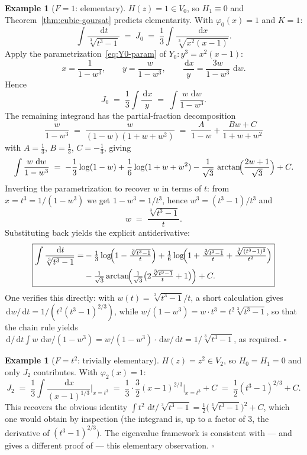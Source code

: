 \documentclass[11pt,a4paper]{article}
\theoremstyle{plain}
\theoremstyle{definition}
\newtheorem{example}[theorem]{Example}
\theoremstyle{remark}
\renewcommand{\d}{\,\mathrm{d}}
\begin{document}
\begin{example}[$F=1$: elementary]\label{ex:F1}
$H(z)=1\in V_0$, so $H_1\equiv 0$ and Theorem~\ref{thm:cubic-goursat} predicts elementarity. With $\varphi_0(x)=1$ and $K=1$:
\[
  \int \frac{\d t}{\sqrt[3]{t^3-1}} \;=\; J_0 \;=\; \frac{1}{3}\int \frac{\d x}{\sqrt[3]{x^2(x-1)}}.
\]
Apply the parametrization~\eqref{eq:Y0-param} of $Y_0\colon y^3=x^2(x-1)$:
\[
  x = \frac{1}{1-w^3},\qquad y = \frac{w}{1-w^3},\qquad \frac{\d x}{y} = \frac{3w}{1-w^3}\,\d w.
\]
Hence
\[
  J_0 \;=\; \frac{1}{3}\int \frac{\d x}{y} \;=\; \int \frac{w\,\d w}{1-w^3}.
\]
The remaining integrand has the partial-fraction decomposition
\[
  \frac{w}{1-w^3} \;=\; \frac{w}{(1-w)(1+w+w^2)} \;=\; \frac{A}{1-w} + \frac{Bw+C}{1+w+w^2}
\]
with $A=\tfrac{1}{3}$, $B=\tfrac{1}{3}$, $C=-\tfrac{1}{3}$, giving
\[
  \int \frac{w\,\d w}{1-w^3} \;=\; -\frac{1}{3}\log(1-w) + \frac{1}{6}\log(1+w+w^2) - \frac{1}{\sqrt{3}}\,\arctan\!\Bigl(\frac{2w+1}{\sqrt{3}}\Bigr) + C.
\]
Inverting the parametrization to recover $w$ in terms of $t$: from $x=t^3=1/(1-w^3)$ we get $1-w^3=1/t^3$, hence $w^3 = (t^3-1)/t^3$ and
\[
  w \;=\; \frac{\sqrt[3]{t^3-1}}{t}.
\]
Substituting back yields the explicit antiderivative:
\[
\boxed{
\begin{aligned}
  \int \frac{\d t}{\sqrt[3]{t^3-1}}
   = &-\tfrac{1}{3}\log\!\Bigl(1-\tfrac{\sqrt[3]{t^3-1}}{t}\Bigr)
     + \tfrac{1}{6}\log\!\Bigl(1+\tfrac{\sqrt[3]{t^3-1}}{t} + \tfrac{\sqrt[3]{(t^3-1)^2}}{t^2}\Bigr) \\
   & - \tfrac{1}{\sqrt{3}}\arctan\!\Bigl(\tfrac{1}{\sqrt{3}}\bigl(2\tfrac{\sqrt[3]{t^3-1}}{t} + 1\bigr)\Bigr) + C.
\end{aligned}
}
\]
One verifies this directly: with $w(t) = \sqrt[3]{t^3-1}/t$, a short calculation gives $\d w/\d t = 1/(t^2(t^3-1)^{2/3})$, while $w/(1-w^3) = w\cdot t^3 = t^2 \sqrt[3]{t^3-1}$, so that the chain rule yields $\d/\d t \int w\,\d w/(1-w^3) = w/(1-w^3)\cdot \d w/\d t = 1/\sqrt[3]{t^3-1}$, as required. \hfill$\square$
\end{example}

\begin{example}[$F=t^2$: trivially elementary]\label{ex:Ft2}
$H(z)=z^2\in V_2$, so $H_0=H_1=0$ and only $J_2$ contributes. With $\varphi_2(x)=1$:
\[
  J_2 \;=\; \frac{1}{3}\int \frac{\d x}{(x-1)^{1/3}}\bigg|_{x=t^3} \;=\; \frac{1}{3}\cdot\frac{3}{2}(x-1)^{2/3}\bigg|_{x=t^3} + C \;=\; \frac{1}{2}(t^3-1)^{2/3} + C.
\]
This recovers the obvious identity $\int t^2\,\d t/\sqrt[3]{t^3-1} = \tfrac{1}{2}\bigl(\sqrt[3]{t^3-1}\bigr)^2 + C$, which one would obtain by inspection (the integrand is, up to a factor of $3$, the derivative of $(t^3-1)^{2/3}$). The eigenvalue framework is consistent with --- and gives a different proof of --- this elementary observation. \hfill$\square$
\end{example}
\end{document}
